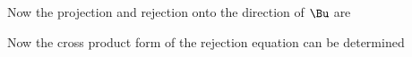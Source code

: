 
Now the projection and rejection onto the direction of \( \Bu \) are


%
%
Now the cross product form of the rejection equation can be determined
